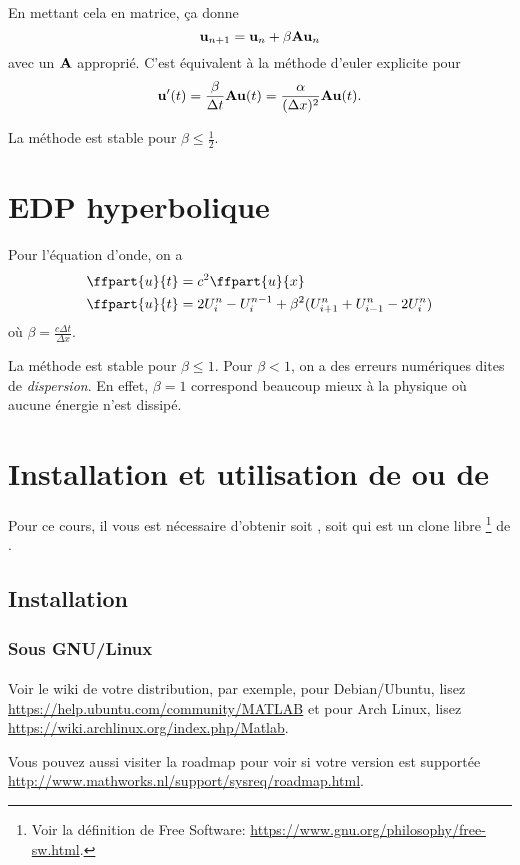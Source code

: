 En mettant cela en matrice, ça donne
\[ {\bf u}_{n+1} = {\bf u}_n + \beta {\bf A}{\bf u}_n \]
avec un ${\bf A}$ approprié.
C'est équivalent à la méthode d'euler explicite pour
\[ {\bf u}'(t) =
\frac{\beta}{\Delta t}{\bf A}{\bf u}(t) =
\frac{\alpha}{(\Delta x)^2}{\bf A}{\bf u}(t). \]

La méthode est stable pour $\beta \leq \frac{1}{2}$.

\section{EDP hyperbolique}
Pour l'équation d'onde, on a
\begin{align*}
  \ffpart{u}{t} & = c^2 \ffpart{u}{x}\\
  \ffpart{u}{t} & = 2U_i^n - U_i^{n-1} + \beta^2
  (U_{i+1}^n + U_{i-1}^n - 2U_i^n)
\end{align*}
où $\beta = \frac{c\Delta t}{\Delta x}$.

La méthode est stable pour $\beta \leq 1$.
Pour $\beta < 1$, on a des erreurs numériques dites de \emph{dispersion}.
En effet, $\beta = 1$ correspond beaucoup mieux à la physique où
aucune énergie n'est dissipé.

\annexe
\section{Installation et utilisation de \matlab{} ou de \octave{}}
Pour ce cours, il vous est nécessaire d'obtenir soit \matlab{},
soit \octave{} qui est un clone libre
\footnote{Voir la définition de Free Software:
  \url{https://www.gnu.org/philosophy/free-sw.html}.}
de \matlab{}.

\subsection{Installation}
\subsubsection{Sous GNU/Linux}
\paragraph{\matlab{}}
Voir le wiki de votre distribution, par exemple,
pour Debian/Ubuntu, lisez
\url{https://help.ubuntu.com/community/MATLAB} et pour
Arch Linux, lisez
\url{https://wiki.archlinux.org/index.php/Matlab}.

Vous pouvez aussi visiter la roadmap pour voir si votre version est
supportée \url{http://www.mathworks.nl/support/sysreq/roadmap.html}.

